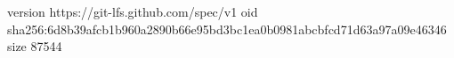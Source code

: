 version https://git-lfs.github.com/spec/v1
oid sha256:6d8b39afcb1b960a2890b66e95bd3bc1ea0b0981abcbfcd71d63a97a09e46346
size 87544

